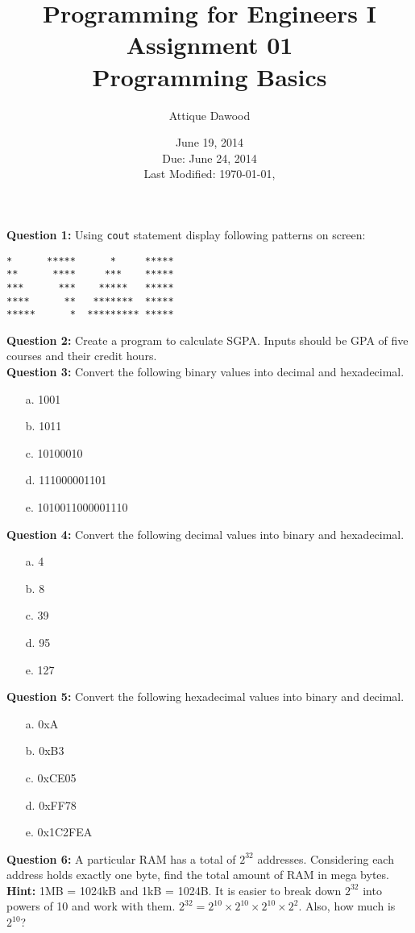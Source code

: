 \documentclass[12pt,a4paper]{article}
\title{Programming for Engineers I\\Assignment 01\\Programming Basics}
\author{Attique Dawood}
\date{June 19, 2014\\Due: June 24, 2014\\[0.2cm] Last Modified: \today, \currenttime}
\begin{document}
\maketitle
\noindent\textbf{Question 1:} Using \verb|cout| statement display following patterns on screen:
\begin{lstlisting}
*      *****      *     *****
**      ****     ***    *****
***      ***    *****   *****
****      **   *******  *****
*****      *  ********* *****
\end{lstlisting}
\noindent\textbf{Question 2:} Create a program to calculate SGPA. Inputs should be GPA of five courses and their credit hours.\\
\noindent\textbf{Question 3:} Convert the following binary values into decimal and hexadecimal.
\begin{enumerate}
\item[a.] 1001
\item[b.] 1011
\item[c.] 10100010
\item[d.] 111000001101
\item[e.] 1010011000001110
\end{enumerate}
\noindent\textbf{Question 4:} Convert the following decimal values into binary and hexadecimal.
\begin{enumerate}
\item[a.] 4
\item[b.] 8
\item[c.] 39
\item[d.] 95
\item[e.] 127
\end{enumerate}
\noindent\textbf{Question 5:} Convert the following hexadecimal values into binary and decimal.
\begin{enumerate}
\item[a.] 0xA
\item[b.] 0xB3
\item[c.] 0xCE05
\item[d.] 0xFF78
\item[e.] 0x1C2FEA
\end{enumerate}
\noindent\textbf{Question 6:} A particular RAM has a total of $2^{32}$ addresses. Considering each address holds exactly one byte, find the total amount of RAM in mega bytes.\\
\noindent\textbf{Hint:} 1MB = 1024kB and 1kB = 1024B. It is easier to break down $2^{32}$ into powers of 10 and work with them. $2^{32}=2^{10}\times 2^{10}\times 2^{10}\times 2^2$. Also, how much is $2^{10}$?\\
\end{document}
